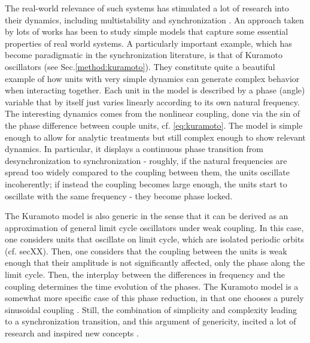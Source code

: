 The real-world relevance of such systems has stimulated a lot of research into their dynamics, including multistability and synchronization \cite{}. An approach taken by lots of works has been to study simple models that capture some essential properties of real world systems. A particularly important example, which has become paradigmatic in the synchronization literature, is that of Kuramoto oscillators (see Sec.\ref{method:kuramoto}). They constitute quite a beautiful example of how units with very simple dynamics can generate complex behavior when interacting together. Each unit in the model is described by a phase (angle) variable that by itself just varies linearly according to its own natural frequency. The interesting dynamics comes from the nonlinear coupling, done via the sin of the phase difference between couple units, cf. \eqref{eq:kuramoto}. The model is simple enough to allow for analytic treatments \cite{} but still complex enough to show relevant dynamics. In particular, it displays a continuous phase transition from desynchronization to synchronization - roughly, if the natural frequencies are spread too widely compared to the coupling between them, the units oscillate incoherently; if instead the coupling becomes large enough, the units start to oscillate with the same frequency - they become phase locked. 

The Kuramoto model is also generic in the sense that it can be derived as an approximation of general limit cycle oscillators under weak coupling. In this case, one considers units that oscillate on limit cycle, which are isolated periodic orbits (cf. secXX). Then, one considers that the coupling between the units is weak enough that their amplitude is not significantly affected, only the phase along the limit cycle. Then, the interplay between the differences in frequency and the coupling determines the time evolution of the phases. The Kuramoto model is a somewhat more specific case of this phase reduction, in that one chooses a purely sinusoidal coupling \cite{strogatz2000from}. Still, the combination of simplicity and complexity leading to a synchronization transition, and this argument of genericity, incited a lot of research and inspired new concepts \cite{acebron2005kuramoto, rodrigues2016the, strogatz2000from}.

